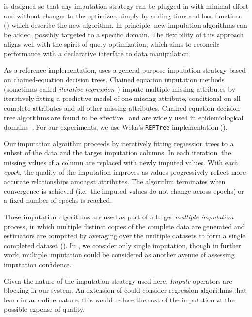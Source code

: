 \ProjectName{} is designed so that any imputation strategy can be plugged in with minimal
effort and without changes to the optimizer, simply by adding time and loss functions
() which describe the new algorithm. In principle, new imputation algorithms
can be added, possibly targeted to a specific domain. The flexibility of this approach
aligns well with the spirit of query optimization, which aims to reconcile performance with
a declarative interface to data manipulation. 

As a reference implementation, \ProjectName{} uses a general-purpose imputation strategy
based on chained-equation decision trees.  Chained equation
imputation methods~\cite{vanbuuren2011mice} (sometimes called \textit{iterative
regression}~\cite{gelman2006data}) impute multiple missing attributes by iteratively fitting
a predictive model of one missing attribute, conditional on all complete attributes
and all other missing attributes. Chained-equation decision tree algorithms are found to be
effective~\cite{akande2015empirical} and are widely used in epidemiological
domains~\cite{burgette2010multiple}. For our experiments, we use Weka's {\tt REPTree}
implementation (\cite{witten2016data}).

Our imputation algorithm proceeds by iteratively fitting regression trees to a subset of the
data and the target imputation columns. In each iteration, the missing values of a column are
replaced with newly imputed values. With each {\it epoch}, the quality of the imputation
improves as values progressively reflect more accurate relationships amongst attributes. The
algorithm terminates when convergence is achieved (i.e.\ the imputed values do not change
across epochs) or a fixed number of epochs is reached. 

These imputation algorithms are used as part of a larger \textit{multiple imputation}
process, in which multiple distinct copies of the complete data are generated and estimators
are computed by averaging over the multiple datasets to form a single completed dataset
(\cite{gelman2006data}). In \ProjectName{}, we consider only single imputation, though in
further work, multiple imputation could be considered as another avenue of assessing
imputation confidence.

Given the nature of the imputation strategy used here, {\it Impute} operators are blocking
in our system. An extension of \ProjectName{} could consider regression algorithms that learn in
an online nature; this would reduce the cost of the imputation at the possible expense of
quality.

